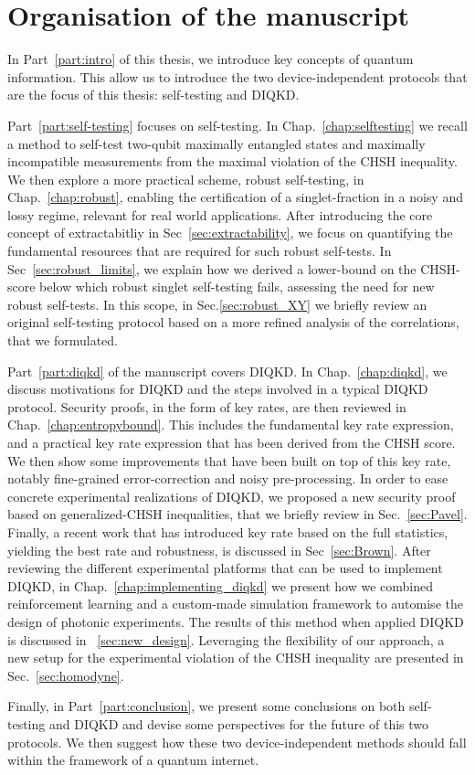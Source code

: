 \chapter{Organisation of the manuscript}

In Part~\ref{part:intro} of this thesis, we introduce key concepts of quantum information.
This allow us to introduce the two device-independent protocols that are the focus of this thesis: self-testing and \acrfull{DIQKD}.

\medbreak

Part~\ref{part:self-testing} focuses on self-testing.
In Chap.~\ref{chap:selftesting} we recall a method to self-test two-qubit maximally entangled states and maximally incompatible measurements from the maximal violation of the CHSH inequality.
We then explore a more practical scheme, robust self-testing, in Chap.~\ref{chap:robust}, enabling the certification of a singlet-fraction in a noisy and lossy regime, relevant for real world applications.
After introducing the core concept of extractabitliy in Sec~\ref{sec:extractability}, we focus on quantifying the fundamental resources that are required for such robust self-tests.
In Sec~\ref{sec:robust_limits}, we explain how we derived a lower-bound on the CHSH-score below which robust singlet self-testing fails, assessing the need for new robust self-tests.
In this scope, in Sec.\ref{sec:robust_XY} we briefly review an original self-testing protocol based on a more refined analysis of the correlations, that we formulated. 
\medbreak

Part~\ref{part:diqkd} of the manuscript covers \acrfull{DIQKD}.
In Chap.~\ref{chap:diqkd}, we discuss motivations for DIQKD and the steps involved in a typical DIQKD protocol.
Security proofs, in the form of key rates, are then reviewed in Chap.~\ref{chap:entropybound}. 
This includes the fundamental key rate expression, and a practical key rate expression that has been derived from the CHSH score. 
We then show some improvements that have been built on top of this key rate, notably fine-grained error-correction and noisy pre-processing. 
In order to ease concrete experimental realizations of DIQKD, we proposed a new security proof based on generalized-CHSH inequalities, that we briefly review in Sec.~\ref{sec:Pavel}.
Finally, a recent work that has introduced key rate based on the full statistics, yielding the best rate and robustness, is discussed in Sec~\ref{sec:Brown}.
After reviewing the different experimental platforms that can be used to implement DIQKD, in Chap.~\ref{chap:implementing_diqkd} we present how we combined reinforcement learning and a custom-made simulation framework to automise the design of photonic experiments.
The results of this method when applied DIQKD is discussed in ~\ref{sec:new_design}.
Leveraging the flexibility of our approach, a new setup for the experimental violation of the CHSH inequality are presented in Sec.~\ref{sec:homodyne}.

\medbreak
Finally, in Part~\ref{part:conclusion}, we present some conclusions on both self-testing and DIQKD and devise some perspectives for the future of this two protocols. 
We then suggest how these two device-independent methods should fall within the framework of a quantum internet.
